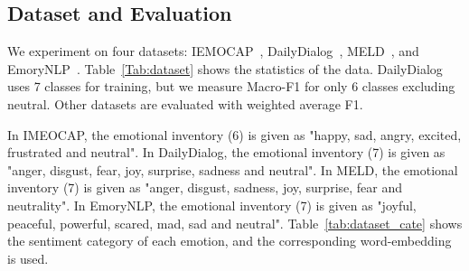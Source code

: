\documentclass[a4paper]{article}
\begin{document}
\subsection{Dataset and Evaluation}
We experiment on four datasets: IEMOCAP~\cite{iemocap}, DailyDialog~\cite{dailydialog}, MELD~\cite{poria-etal-2019-meld}, and EmoryNLP~\cite{emorynlp}. Table~\ref{Tab:dataset} shows the statistics of the data. DailyDialog uses 7 classes for training, but we measure Macro-F1 for only 6 classes excluding neutral. Other datasets are evaluated with weighted average F1. 

\begin{table}[!t]
\centering
{}
\caption{The sentiment category of the emotion corresponding to each dataset}
\label{tab:dataset_cate}
\end{table}

In IMEOCAP, the emotional inventory (6) is given as "happy, sad, angry, excited, frustrated and neutral". In DailyDialog, the emotional inventory (7) is given as "anger, disgust, fear, joy, surprise, sadness and neutral". In MELD, the emotional inventory (7) is given as "anger, disgust, sadness, joy, surprise, fear and neutrality". In EmoryNLP, the emotional inventory (7) is given as "joyful, peaceful, powerful, scared, mad, sad and neutral". Table~\ref{tab:dataset_cate} shows the sentiment category of each emotion, and the corresponding word-embedding is used.
\end{document}
